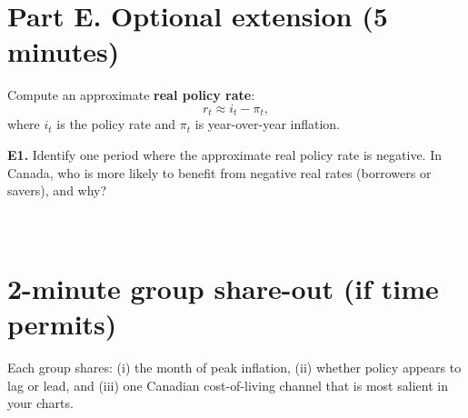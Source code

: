 \documentclass[12pt]{article}
\begin{document}
\section*{Part E. Optional extension (5 minutes)}
Compute an approximate \textbf{real policy rate}:
\[
r_t \approx i_t - \pi_t,
\]
where $i_t$ is the policy rate and $\pi_t$ is year-over-year inflation.

\vspace{0.5em}
\textbf{E1.} Identify one period where the approximate real policy rate is negative. In Canada, who is more likely to benefit from negative real rates (borrowers or savers), and why?\\[0.75em]
\underline{\hspace{0.9\linewidth}}\\[0.75em]
\underline{\hspace{0.9\linewidth}}\\[0.75em]
\underline{\hspace{0.9\linewidth}}

\section*{2-minute group share-out (if time permits)}
Each group shares: (i) the month of peak inflation, (ii) whether policy appears to lag or lead, and (iii) one Canadian cost-of-living channel that is most salient in your charts.
\end{document}
